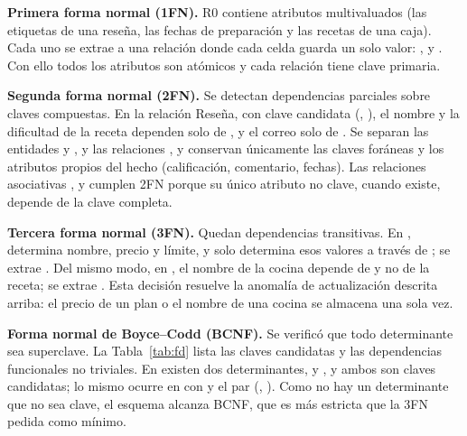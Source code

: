 \textbf{Primera forma normal (1FN).} R0 contiene atributos multivaluados (las etiquetas de una reseña, las fechas de preparación y las recetas de una caja). Cada uno se extrae a una relación donde cada celda guarda un solo valor: ,  y . Con ello todos los atributos son atómicos y cada relación tiene clave primaria.

\textbf{Segunda forma normal (2FN).} Se detectan dependencias parciales sobre claves compuestas. En la relación Reseña, con clave candidata (, ), el nombre y la dificultad de la receta dependen solo de , y el correo solo de . Se separan las entidades  y , y las relaciones ,  y  conservan únicamente las claves foráneas y los atributos propios del hecho (calificación, comentario, fechas). Las relaciones asociativas ,  y  cumplen 2FN porque su único atributo no clave, cuando existe, depende de la clave completa.

\textbf{Tercera forma normal (3FN).} Quedan dependencias transitivas. En ,  determina nombre, precio y límite, y  solo determina esos valores a través de ; se extrae . Del mismo modo, en , el nombre de la cocina depende de  y no de la receta; se extrae . Esta decisión resuelve la anomalía de actualización descrita arriba: el precio de un plan o el nombre de una cocina se almacena una sola vez.

\textbf{Forma normal de Boyce--Codd (BCNF).} Se verificó que todo determinante sea superclave. La Tabla~\ref{tab:fd} lista las claves candidatas y las dependencias funcionales no triviales. En  existen dos determinantes,  y , y ambos son claves candidatas; lo mismo ocurre en  con  y el par (, ). Como no hay un determinante que no sea clave, el esquema alcanza BCNF, que es más estricta que la 3FN pedida como mínimo.

